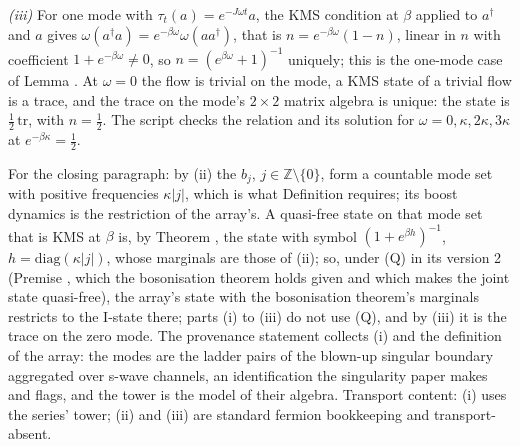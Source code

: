 \emph{(iii)} For one mode with $\tau_t(a) = e^{-J\omega t}a$, the KMS condition at $\beta$ applied to $a^{\dagger}$ and $a$ gives $\omega(a^{\dagger}a) = e^{-\beta\omega}\omega(aa^{\dagger})$, that is $n = e^{-\beta\omega}(1 - n)$, linear in $n$ with coefficient $1 + e^{-\beta\omega} \neq 0$, so $n = (e^{\beta\omega} + 1)^{-1}$ uniquely; this is the one-mode case of Lemma . At $\omega = 0$ the flow is trivial on the mode, a KMS state of a trivial flow is a trace, and the trace on the mode's $2 \times 2$ matrix algebra is unique: the state is $\tfrac12\,\mathrm{tr}$, with $n = \tfrac12$. The script checks the relation and its solution for $\omega = 0, \kappa, 2\kappa, 3\kappa$ at $e^{-\beta\kappa} = \tfrac12$.

For the closing paragraph: by (ii) the $b_j$, $j \in \mathbb{Z}\setminus\{0\}$, form a countable mode set with positive frequencies $\kappa|j|$, which is what Definition  requires; its boost dynamics is the restriction of the array's. A quasi-free state on that mode set that is KMS at $\beta$ is, by Theorem , the state with symbol $(1 + e^{\beta h})^{-1}$, $h = \mathrm{diag}(\kappa|j|)$, whose marginals are those of (ii); so, under (Q) in its version 2 (Premise , which the bosonisation theorem holds given and which makes the joint state quasi-free), the array's state with the bosonisation theorem's marginals restricts to the I-state there; parts (i) to (iii) do not use (Q), and by (iii) it is the trace on the zero mode. The provenance statement collects (i) and the definition of the array: the modes are the ladder pairs of the blown-up singular boundary aggregated over s-wave channels, an identification the singularity paper makes and flags, and the tower is the model of their algebra. Transport content: (i) uses the series' tower; (ii) and (iii) are standard fermion bookkeeping and transport-absent.
